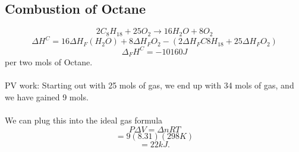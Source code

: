 \documentclass[10pt, twocolumn]{report}
\begin{document}
     \subsection{Combustion of Octane}
     $$2C_8H_{18} + 25O_2 \rightarrow 16H_2O + 8 O_2$$
     $$\Delta H^C = 16 \Delta H_F (H_2O) + 8 \Delta H_F O_2 - (2\Delta H_F C8H_{18} + 25\Delta H_F O_2)$$
     $$\Delta_F H^C = -10160 J $$ per two mols of Octane.\\\\ PV work: Starting out with 25 mols of gas, we end up with 34 mols of gas, and we have gained 9 mols. \\\\ We can plug this into the ideal gas formula $$P\Delta V = \Delta n R T$$ $$ = 9 (8.31)(298K)$$ $$=22 kJ. $$
\end{document}
